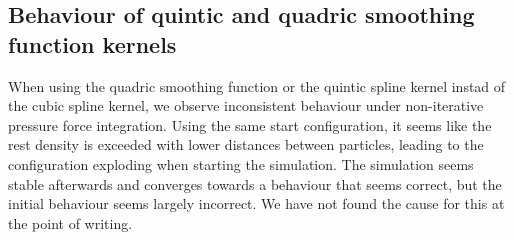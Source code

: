 \documentclass{ACGSeminar}
\begin{document}
\subsection{Behaviour of quintic and quadric smoothing function kernels}

When using the quadric smoothing function or the quintic spline kernel instad of the cubic spline kernel, we observe inconsistent behaviour under non-iterative pressure force integration. Using the same start configuration, it seems like the rest density is exceeded with lower distances between particles, leading to the configuration exploding when starting the simulation. The simulation seems stable afterwards and converges towards a behaviour that seems correct, but the initial behaviour seems largely incorrect. We have not found the cause for this at the point of writing.
\newpage



\printbibliography
\cleardoublepage
\end{document}
